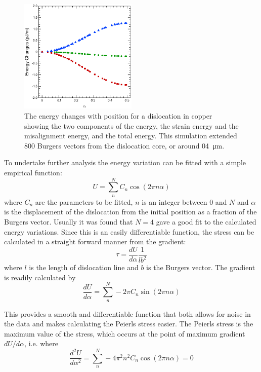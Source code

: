 \begin{figure}
\centering
\includegraphics[width=0.5\textwidth]{Copper_800_rel_energies}
\caption[The energy changes with dislocation position for  copper.]{The energy changes with position for a dislocation in copper showing the two components of the energy, the strain energy and the misalignment energy, and the total energy. This simulation extended \num{800} Burgers vectors from the dislocation core, or around \SI{04}{\micro\meter}.\label{fig:copper_800_rel_energies}}
\end{figure}




To undertake further analysis the energy variation can be fitted with a simple empirical function:
\begin{equation}
U = \sum^N_n C_n \cos (2 \pi n \alpha) \label{eqn:empirical_function}
\end{equation}
where $C_n$ are the parameters to be fitted, $n$ is an integer between $0$ and $N$ and $\alpha$ is the displacement of the dislocation from the initial position as a fraction of the Burgers vector. Usually it was found that $N=4$ gave a good fit to the calculated energy variations. Since this is an easily differentiable function, the stress can be calculated in a straight forward manner from the gradient:
\begin{equation}
\tau = \frac{dU}{d\alpha} \frac{1}{lb^2}
\end{equation}
where $l$ is the length of dislocation line and $b$ is the Burgers vector. The gradient is readily calculated by
\begin{equation}
\frac{dU}{d\alpha} = \sum_n^N - 2 \pi C_n \sin ( 2 \pi n \alpha )
\end{equation}

This provides a smooth and differentiable function that both allows for noise in the data and makes calculating the Peierls stress easier. The Peierls stress is the maximum value of the stress, which occurs at the point of maximum gradient $dU/d\alpha$, i.e. where
\begin{equation}
\frac{d^2U}{d\alpha^2} = \sum_n^N -4 \pi^2 n^2 C_n \cos ( 2 \pi n \alpha ) = 0
\end{equation}

